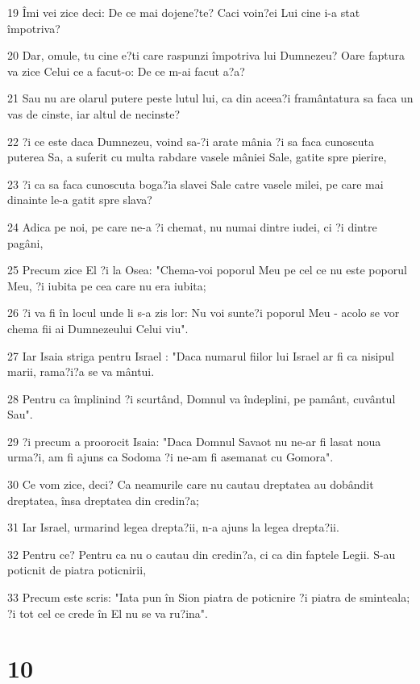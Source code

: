 \par 19 Îmi vei zice deci: De ce mai dojene?te? Caci voin?ei Lui cine i-a stat împotriva?
\par 20 Dar, omule, tu cine e?ti care raspunzi împotriva lui Dumnezeu? Oare faptura va zice Celui ce a facut-o: De ce m-ai facut a?a?
\par 21 Sau nu are olarul putere peste lutul lui, ca din aceea?i framântatura sa faca un vas de cinste, iar altul de necinste?
\par 22 ?i ce este daca Dumnezeu, voind sa-?i arate mânia ?i sa faca cunoscuta puterea Sa, a suferit cu multa rabdare vasele mâniei Sale, gatite spre pierire,
\par 23 ?i ca sa faca cunoscuta boga?ia slavei Sale catre vasele milei, pe care mai dinainte le-a gatit spre slava?
\par 24 Adica pe noi, pe care ne-a ?i chemat, nu numai dintre iudei, ci ?i dintre pagâni,
\par 25 Precum zice El ?i la Osea: "Chema-voi poporul Meu pe cel ce nu este poporul Meu, ?i iubita pe cea care nu era iubita;
\par 26 ?i va fi în locul unde li s-a zis lor: Nu voi sunte?i poporul Meu - acolo se vor chema fii ai Dumnezeului Celui viu".
\par 27 Iar Isaia striga pentru Israel : "Daca numarul fiilor lui Israel ar fi ca nisipul marii, rama?i?a se va mântui.
\par 28 Pentru ca împlinind ?i scurtând, Domnul va îndeplini, pe pamânt, cuvântul Sau".
\par 29 ?i precum a proorocit Isaia: "Daca Domnul Savaot nu ne-ar fi lasat noua urma?i, am fi ajuns ca Sodoma ?i ne-am fi asemanat cu Gomora".
\par 30 Ce vom zice, deci? Ca neamurile care nu cautau dreptatea au dobândit dreptatea, însa dreptatea din credin?a;
\par 31 Iar Israel, urmarind legea drepta?ii, n-a ajuns la legea drepta?ii.
\par 32 Pentru ce? Pentru ca nu o cautau din credin?a, ci ca din faptele Legii. S-au poticnit de piatra poticnirii,
\par 33 Precum este scris: "Iata pun în Sion piatra de poticnire ?i piatra de sminteala; ?i tot cel ce crede în El nu se va ru?ina".

\chapter{10}

